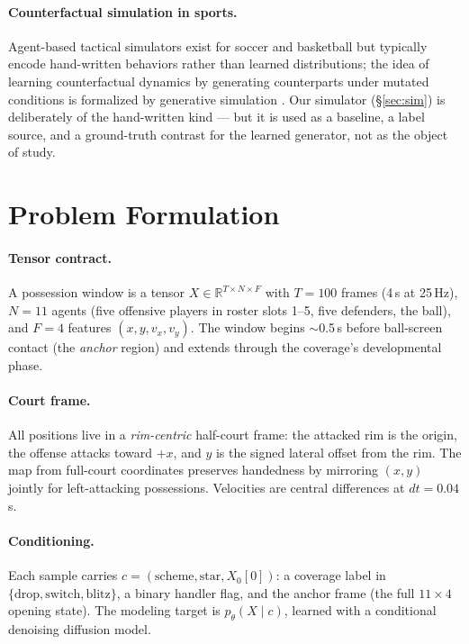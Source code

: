 \documentclass[11pt]{article}
\newcommand{\R}{\mathbb{R}}
\begin{document}
\paragraph{Counterfactual simulation in sports.}
Agent-based tactical simulators exist for soccer and basketball but typically
encode hand-written behaviors rather than learned distributions; the idea of
learning counterfactual dynamics by generating counterparts under mutated
conditions is formalized by generative simulation \citep{zhan2022gensim}.
Our simulator (\S\ref{sec:sim}) is deliberately of the hand-written kind ---
but it is used as a baseline, a label source, and a ground-truth contrast for
the learned generator, not as the object of study.

\section{Problem Formulation}
\label{sec:problem}

\paragraph{Tensor contract.}
A possession window is a tensor
$X \in \R^{T \times N \times F}$ with $T{=}100$ frames (4\,s at 25\,Hz),
$N{=}11$ agents (five offensive players in roster slots 1--5, five defenders,
the ball), and $F{=}4$ features $(x, y, v_x, v_y)$. The window begins
$\sim$0.5\,s before ball-screen contact (the \emph{anchor} region) and extends
through the coverage's developmental phase.

\paragraph{Court frame.}
All positions live in a \emph{rim-centric} half-court frame: the attacked rim
is the origin, the offense attacks toward $+x$, and $y$ is the signed lateral
offset from the rim. The map from full-court coordinates preserves handedness
by mirroring $(x, y)$ jointly for left-attacking possessions. Velocities are
central differences at $dt = 0.04$\,s.

\paragraph{Conditioning.}
Each sample carries $c = (\text{scheme}, \text{star}, X_0[0])$: a coverage
label in $\{\text{drop}, \text{switch}, \text{blitz}\}$, a binary handler
flag, and the anchor frame (the full $11{\times}4$ opening state). The
modeling target is
$p_\theta(X \mid c)$, learned with a conditional denoising diffusion model.
\end{document}
